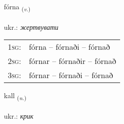 \documentclass[frontgrid, backgrid]{flacards}\usepackage[]{graphicx}\usepackage[]{xcolor}
\begin{document}
\renewcommand{\flhead}{\vskip5pt \fboxsep=0pt {\small\bfseries\footnotesize Sagnorð | дієслово}}
\renewcommand{\fcfoot}{\vskip5pt \fboxsep=0pt \hspace{2pt}{\small\bfseries\footnotesize 3K}}

\renewcommand{\blhead}{\vskip5pt {\small\bfseries\footnotesize Sagnorð | дієслово }}
\renewcommand{\bcfoot}{\vskip5pt \hspace{2pt}{\small\bfseries\footnotesize 3K}}


{fórna \small{\textsubscript{(\textit{v.})}} \\[1ex] %
\textphonetic{[fourtna]} \\
ukr.: \emph{жертвувати} \\  [2ex]
\renewcommand*{\arraystretch}{0.8}
\begin{tabular}{p{1cm}l}
\textsc{1sg}: & fórna -- fórnaði -- fórnað \\ 
\textsc{2sg}: & fórnar -- fórnaðir -- fórnað \\ 
\textsc{3sg}: & fórnar -- fórnaði -- fórnað \\ 
\end{tabular}
}

\renewcommand{\flhead}{\vskip5pt \fboxsep=0pt {\small\bfseries\footnotesize Nafnorð | іменник}}
\renewcommand{\fcfoot}{\vskip5pt \fboxsep=0pt \hspace{2pt}{\small\bfseries\footnotesize 3K}}

\renewcommand{\blhead}{\vskip5pt {\small\bfseries\footnotesize Nafnorð | іменник }}
\renewcommand{\bcfoot}{\vskip5pt \hspace{2pt}{\small\bfseries\footnotesize 3K}}


{kall \small{\textsubscript{(\textit{n.})}} \\[1ex] %
\textphonetic{[kʰatl̥]} \\
ukr.: \emph{крик} \\  [2ex]
\renewcommand*{\arraystretch}{0.8}
}
\end{document}
